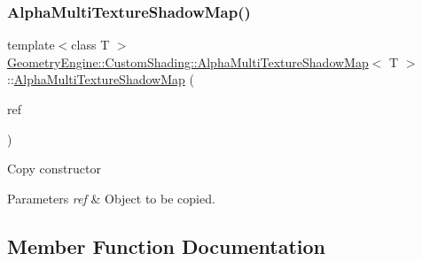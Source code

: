 \subsubsection{\texorpdfstring{AlphaMultiTextureShadowMap()}{AlphaMultiTextureShadowMap()}\hspace{0.1cm}{\footnotesize\ttfamily [2/2]}}
{\footnotesize\ttfamily template$<$class T $>$ \\
\mbox{\hyperlink{class_geometry_engine_1_1_custom_shading_1_1_alpha_multi_texture_shadow_map}{Geometry\+Engine\+::\+Custom\+Shading\+::\+Alpha\+Multi\+Texture\+Shadow\+Map}}$<$ T $>$\+::\mbox{\hyperlink{class_geometry_engine_1_1_custom_shading_1_1_alpha_multi_texture_shadow_map}{Alpha\+Multi\+Texture\+Shadow\+Map}} (\begin{DoxyParamCaption}\item[{const \mbox{\hyperlink{class_geometry_engine_1_1_custom_shading_1_1_custom_shading_step}{Custom\+Shading\+Step}} \&}]{ref }\end{DoxyParamCaption})\hspace{0.3cm}{\ttfamily [inline]}}

Copy constructor 
\begin{DoxyParams}{Parameters}
{\em ref} & Object to be copied. \\
\hline
\end{DoxyParams}


\subsection{Member Function Documentation}
\mbox{\label{class_geometry_engine_1_1_custom_shading_1_1_alpha_multi_texture_shadow_map_a7a62881619d6247fee10fb74d4fc79e2}} 
